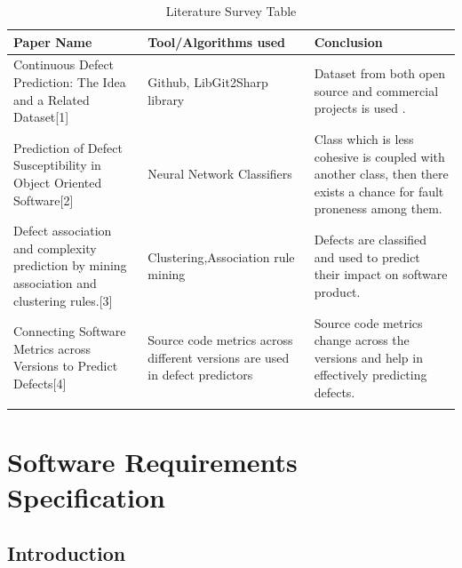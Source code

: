 \documentclass[oneside,a4paper,12pt]{book}
\begin{document}
\begin{table}[H]
 			\centering
\begin{tabular}{p{1.77in}p{1.95in}p{1.95in}}
\hline
\multicolumn{1}{|p{1.77in}}{Paper Name} & 
\multicolumn{1}{|p{1.95in}}{Tool/Algorithms used} & 
\multicolumn{1}{|p{1.95in}|}{Conclusion} \\ 
\hline
\multicolumn{1}{|p{1.77in}}{Continuous Defect Prediction: The Idea and a Related Dataset[1] \par } & 
\multicolumn{1}{|p{1.95in}}{Github, LibGit2Sharp library} & 
\multicolumn{1}{|p{1.95in}|}{Dataset from both open source and commercial projects is used . } \\
\hline
\multicolumn{1}{|p{1.77in}}{Prediction of Defect Susceptibility in Object Oriented Software[2]} & 
\multicolumn{1}{|p{1.95in}}{Neural Network Classifiers} & 
\multicolumn{1}{|p{1.95in}|}{Class which is less cohesive is coupled with another class, then there exists a chance for fault proneness among them.} \\
\hline
\multicolumn{1}{|p{1.77in}}{Defect association and complexity prediction by mining association and clustering rules.[3]} & 
\multicolumn{1}{|p{1.95in}}{Clustering,Association rule mining} & 
\multicolumn{1}{|p{1.95in}|}{Defects are classified and used to predict their impact on software product. } \\
\hline
\multicolumn{1}{|p{1.77in}}{Connecting Software Metrics across Versions to Predict Defects[4]} & 
\multicolumn{1}{|p{1.95in}}{Source code metrics across different versions are used in defect predictors} & 
\multicolumn{1}{|p{1.95in}|}{Source code metrics change across the versions and help in effectively predicting defects.} \\
\hline}

\end{tabular}\caption{Literature Survey Table}
\label{tab:Literature Survey Table}

 \end{table}
 \endgroup



\chapter{Software Requirements Specification}

\section{Introduction}
\end{document}
